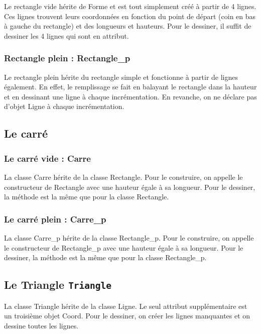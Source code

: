\documentclass[11pt]{article}
\begin{document}
Le rectangle vide hérite de Forme et est tout simplement créé à partir de 4 lignes. Ces lignes trouvent leurs coordonnées en fonction du point de départ (coin en bas à gauche du rectangle) et des longueurs et hauteurs. Pour le dessiner, il suffit de dessiner les 4 lignes qui sont en attribut. 

\subsubsection{Rectangle plein : Rectangle\_p}

Le rectangle plein hérite du rectangle simple et fonctionne à partir de lignes également. En effet, le remplissage se fait en balayant le rectangle dans la hauteur et en dessinant une ligne à chaque incrémentation. En revanche, on ne déclare pas d'objet Ligne à chaque incrémentation. 

\subsection{Le carré}

\subsubsection{Le carré vide : Carre}

La classe Carre hérite de la classe Rectangle. Pour le construire, on appelle le constructeur de Rectangle avec une hauteur égale à sa longueur. Pour le dessiner, la méthode est la même que pour la classe Rectangle. 

\subsubsection{Le carré plein : Carre\_p}

La classe Carre\_p hérite de la classe Rectangle\_p. Pour le construire, on appelle le constructeur de Rectangle\_p avec une hauteur égale à sa longueur. Pour le dessiner, la méthode est la même que pour la classe Rectangle\_p. 


\subsection{Le Triangle \texttt{Triangle}}

La classe Triangle hérite de la classe Ligne. Le seul attribut supplémentaire est un troisième objet Coord. Pour le dessiner, on créer les lignes manquantes et on dessine toutes les lignes. 
\end{document}
